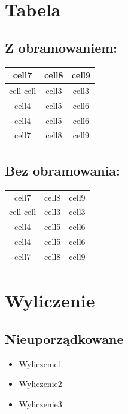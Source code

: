 \documentclass{report}
\begin{document}
    \section{Tabela}
        \subsection{Z obramowaniem:}
            \begin{tabular}{| c | c | c |}
                \hline
                cell7 & cell8 & cell9\\
                \hline
                cell cell & cell3 & cell3 \\
                \hline
                cell4 & cell5 & cell6 \\
                \hline
                cell4 & cell5 & cell6 \\
                \hline
                cell7 & cell8 & cell9 \\
                \hline
            \end{tabular}

        \subsection{Bez obramowania:}
            \begin{tabular}{c c c}
                cell7 & cell8 & cell9\\
                cell cell & cell3 & cell3 \\
                cell4 & cell5 & cell6 \\
                cell4 & cell5 & cell6 \\
                cell7 & cell8 & cell9  
            \end{tabular}

    \section{Wyliczenie}
        \subsection{Nieuporządkowane}
            \begin{itemize}
                \item Wyliczenie1
                \item Wyliczenie2
                \item Wyliczenie3
            \end{itemize}
\end{document}
